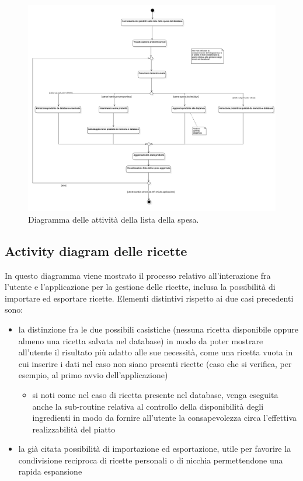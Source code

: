 \begin{figure}[H]
    \includegraphics[width=\linewidth]{images/activity-shopping-list.png}
    \caption{Diagramma delle attività della lista della spesa.}
    \label{fig:actshoplist}
\end{figure}

\newpage

\subsection{Activity diagram delle ricette}

In questo diagramma viene mostrato il processo relativo all'interazione fra l'utente e l'applicazione per la gestione delle ricette, inclusa la possibilità di importare ed esportare ricette.
Elementi distintivi rispetto ai due casi precedenti sono:
\begin{itemize}
\item la distinzione fra le due possibili casistiche (nessuna ricetta disponibile oppure almeno una ricetta salvata nel database) in modo da poter mostrare all'utente il risultato più adatto alle sue necessità, come una ricetta vuota in cui inserire i dati nel caso non siano presenti ricette (caso che si verifica, per esempio, al primo avvio dell'applicazione)
\begin{itemize}
\item si noti come nel caso di ricetta presente nel database, venga eseguita anche la sub-routine relativa al controllo della disponibilità degli ingredienti in modo da fornire all'utente la consapevolezza circa l'effettiva realizzabilità del piatto
\end{itemize}
\item la già citata possibilità di importazione ed esportazione, utile per favorire la condivisione reciproca di ricette personali o di nicchia permettendone una rapida espansione 
\end{itemize}


